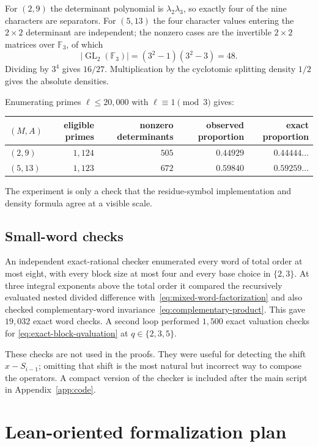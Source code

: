 \documentclass[11pt,oneside]{article}
\theoremstyle{definition}
\theoremstyle{remark}
\newcommand{\F}{\mathbb F}
\begin{document}
For $(2,9)$ the determinant polynomial is $\lambda_2\lambda_3$, so exactly four of the nine
characters are separators.  For $(5,13)$ the four character values entering the $2\times2$
determinant are independent; the nonzero cases are the invertible $2\times2$ matrices over
$\F_3$, of which
\[
 |\operatorname{GL}_2(\F_3)|=(3^2-1)(3^2-3)=48.
\]
Dividing by $3^4$ gives $16/27$.  Multiplication by the cyclotomic splitting density $1/2$
gives the absolute densities.

Enumerating primes $\ell\le20{,}000$ with $\ell\equiv1\pmod3$ gives:

\begin{center}
\small
\begin{tabular}{@{}lrrrr@{}}
\toprule
$(M,A)$ & eligible primes & nonzero determinants & observed proportion & exact proportion \\
\midrule
$(2,9)$ & $1{,}124$ & $505$ & $0.44929$ & $0.44444\ldots$ \\
$(5,13)$ & $1{,}123$ & $672$ & $0.59840$ & $0.59259\ldots$ \\
\bottomrule
\end{tabular}
\end{center}

The experiment is only a check that the residue-symbol implementation and density formula
agree at a visible scale.

\subsection{Small-word checks}

An independent exact-rational checker enumerated every word of total order at most eight,
with every block size at most four and every base choice in $\{2,3\}$.  At three integral
exponents above the total order it compared the recursively evaluated nested divided
difference with~\eqref{eq:mixed-word-factorization} and also checked
complementary-word invariance~\eqref{eq:complementary-product}.  This gave $19{,}032$ exact
word checks.  A second loop performed $1{,}500$ exact valuation checks for
\eqref{eq:exact-block-qvaluation} at $q\in\{2,3,5\}$.

These checks are not used in the proofs.  They were useful for detecting the shift
$x-S_{i-1}$; omitting that shift is the most natural but incorrect way to compose the
operators.  A compact version of the checker is included after the main script in
Appendix~\ref{app:code}.

\section{Lean-oriented formalization plan}
\label{sec:lean}
\end{document}
